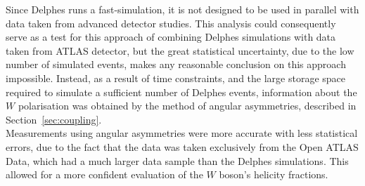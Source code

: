 \documentclass[12pt,a4paper]{article}
\numberwithin{equation}{section}
\begin{document}
Since Delphes runs a fast-simulation, it is not designed to be used in parallel
with data taken from advanced detector studies. This analysis could consequently
serve as a test for this approach of combining Delphes simulations with data
taken from ATLAS detector, but the great statistical uncertainty, due to the low
number of simulated events, makes any reasonable conclusion on this approach
impossible. Instead, as a result of time constraints, and the large storage
space required to simulate a sufficient number of Delphes events, information
about the $W$ polarisation was obtained by the method of angular
asymmetries, described in Section~\ref{sec:coupling}.\\

Measurements using angular asymmetries were more accurate with less statistical
errors, due to the fact that the data was taken exclusively from the Open ATLAS
Data, which had a much larger data sample than the Delphes simulations. This
allowed for a more confident evaluation of the $W$ boson's helicity fractions.\\








\end{document}
